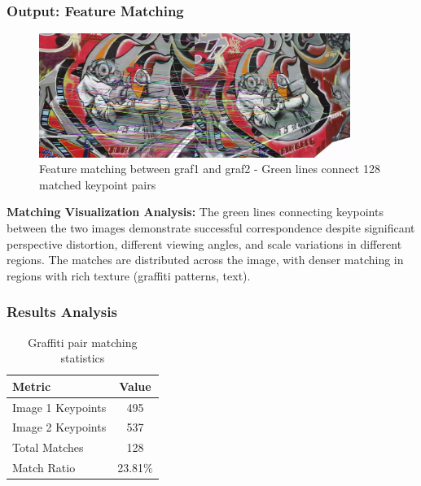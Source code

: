 \documentclass[12pt,a4paper]{article}
\begin{document}
\subsubsection{Output: Feature Matching}

\begin{figure}[H]
\centering
\includegraphics[width=0.9\textwidth]{report/figures/graffiti_matches.jpg}
\caption{Feature matching between graf1 and graf2 - Green lines connect 128 matched keypoint pairs}
\label{fig:graffiti_matches}
\end{figure}

\textbf{Matching Visualization Analysis:}
The green lines connecting keypoints between the two images demonstrate successful correspondence despite significant perspective distortion, different viewing angles, and scale variations in different regions. The matches are distributed across the image, with denser matching in regions with rich texture (graffiti patterns, text).

\subsubsection{Results Analysis}
\begin{table}[H]
\centering
\begin{tabular}{@{}lc@{}}
\toprule
\textbf{Metric} & \textbf{Value} \\
\midrule
Image 1 Keypoints & 495 \\
Image 2 Keypoints & 537 \\
Total Matches & 128 \\
Match Ratio & 23.81\% \\
\bottomrule
\end{tabular}
\caption{Graffiti pair matching statistics}
\end{table}
\end{document}
